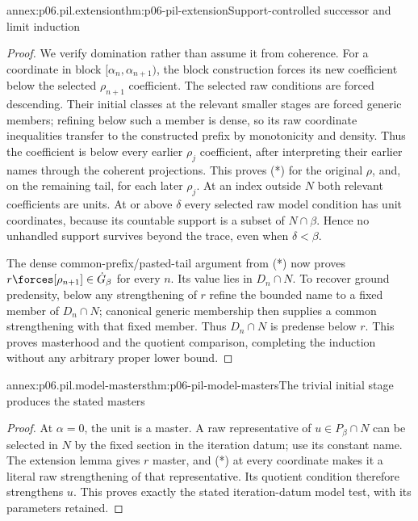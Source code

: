 \begin{annexitem}{annex:p06.pil.extension}{thm:p06-pil-extension}{Support-controlled successor and limit induction}
\begin{proof}
We verify domination rather than assume it from coherence. For a
coordinate in block \([\alpha_n,\alpha_{n+1})\), the block construction
forces its new coefficient below the selected \(\rho_{n+1}\) coefficient.
The selected raw conditions are forced descending. Their initial
classes at the relevant smaller stages are forced generic members;
refining below such a member is dense, so its raw coordinate inequalities
transfer to the constructed prefix by monotonicity and density. Thus
the coefficient is below every earlier \(\rho_j\) coefficient, after
interpreting their earlier names through the coherent projections.
This proves (*) for the original \(\rho\), and, on the remaining tail,
for each later \(\rho_j\). At an index outside \(N\) both relevant
coefficients are units. At or above \(\delta\) every selected raw model
condition has unit coordinates, because its countable support is a
subset of \(N\cap\beta\). Hence no unhandled support survives beyond
the trace, even when \(\delta<\beta\).

The dense common-prefix/pasted-tail argument from (*) now proves
\(r\forces[\rho_{n+1}]\in\dot G_\beta\) for every \(n\).
Its value lies in \(D_n\cap N\). To recover ground predensity, below
any strengthening of \(r\) refine the bounded name to a fixed member
of \(D_n\cap N\); canonical generic membership then supplies a common
strengthening with that fixed member. Thus \(D_n\cap N\) is predense
below \(r\). This proves masterhood and the quotient comparison,
completing the induction without any arbitrary proper lower bound.
\end{proof}
\end{annexitem}

\begin{annexitem}{annex:p06.pil.model-masters}{thm:p06-pil-model-masters}{The trivial initial stage produces the stated masters}
\begin{proof}
At \(\alpha=0\), the unit is a master. A raw representative of
\(u\in P_\beta\cap N\) can be selected in \(N\) by the fixed
section in the iteration datum; use its constant name. The extension
lemma gives \(r\) master, and (*) at every coordinate makes it a
literal raw strengthening of that representative. Its quotient condition
therefore strengthens \(u\). This proves exactly the stated
iteration-datum model test, with its parameters retained.
\end{proof}
\end{annexitem}
